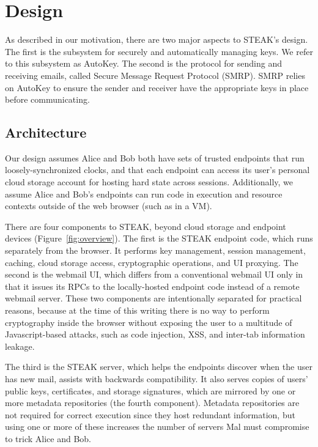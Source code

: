 \section{Design}
\label{sec:design}

As described in our motivation, there are two major aspects to STEAK’s design.  The first is the subsystem for securely and automatically managing keys.  We refer to this subsystem as AutoKey.  The second is the protocol for sending and receiving emails, called Secure Message Request Protocol (SMRP).  SMRP relies on AutoKey to ensure the sender and receiver have the appropriate keys in place before communicating.

\subsection{Architecture}
Our design assumes Alice and Bob both have sets of trusted endpoints that run loosely-synchronized clocks, and that each endpoint can access its user’s personal cloud storage account for hosting hard state across sessions.  Additionally, we assume Alice and Bob's endpoints can run code in execution and resource contexts outside of the web browser (such as in a VM).

There are four components to STEAK, beyond cloud storage and endpoint devices (Figure~\ref{fig:overview}). The first is the STEAK endpoint code, which runs separately from the browser.  It performs key management, session management, caching, cloud storage access, cryptographic operations, and UI proxying. The second is the webmail UI, which differs from a conventional webmail UI only in that it issues its RPCs to the locally-hosted endpoint code instead of a remote webmail server.  These two components are intentionally separated for practical reasons, because at the time of this writing there is no way to perform cryptography inside the browser without exposing the user to a multitude of Javascript-based attacks, such as code injection, XSS, and inter-tab information leakage.

The third is the STEAK server, which helps the endpoints discover when the user has new mail, assists with backwards compatibility.  It also serves copies of users’ public keys, certificates, and storage signatures, which are mirrored by one or more metadata repositories (the fourth component).  Metadata repositories are not required for correct execution since they host redundant information, but using one or more of these increases the number of servers Mal must compromise to trick Alice and Bob.

